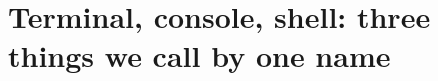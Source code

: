 \chapter{Terminal, console, shell: three things we call by one name}
\label{ch:terminal-console-shell-three-things-we}

